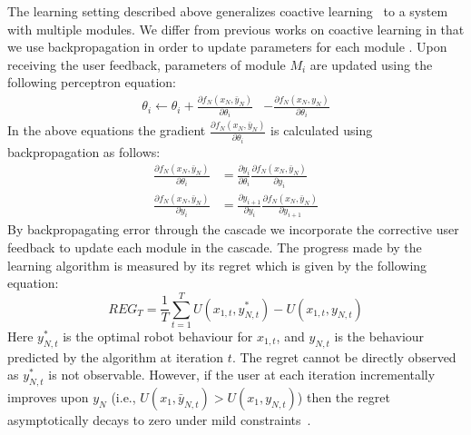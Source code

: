 The learning setting described above generalizes coactive learning~\citep{Jain13,Shivaswamy12} to a system with multiple modules. We differ from previous works on coactive learning in that we use  backpropagation in order to update parameters for each module . Upon receiving the user feedback, parameters of module $M_i$ are updated using the following perceptron equation:  
\begin{align}
\theta_i \leftarrow \theta_i +  \frac{\partial f_N(x_N,\bar{y}_N)}{\partial \theta_i} &- \frac{\partial f_N(x_N,{y}_N)}{\partial \theta_i}
\end{align}
In the above equations the	 gradient $\frac{\partial f_N(x_N,\bar{y}_N)}{\partial \theta_i}$ is calculated using backpropagation as follows:
\begin{align}
\frac{\partial f_N(x_N,\bar{y}_N)}{\partial \theta_i} &= \frac{\partial y_i}{\partial \theta_i}  \frac{\partial f_N(x_N,\bar{y}_N)	}{\partial y_{i}}\\
\frac{\partial f_N(x_N,\bar{y}_N)	}{\partial y_{i}} &= \frac{\partial y_{i+1}	}{\partial y_{i}} \frac{\partial f_N(x_N,\bar{y}_N)	}{\partial y_{i+1}}
\end{align}
By backpropagating error through the cascade we  incorporate the corrective user feedback to update each module in the cascade. The progress made by the learning algorithm is measured by its regret which is given by the following equation:%
\begin{equation}
\label{eq:regret}
REG_T = \frac{1}{T}\sum_{t=1}^T U(x_{1,t},y_{N,t}^*) - U(x_{1,t},y_{N,t}) 
\end{equation}
Here $y_{N,t}^*$ is the optimal robot behaviour for $x_{1,t}$, and $y_{N,t}$ is the behaviour predicted by the algorithm at iteration $t$. The regret cannot be directly observed as $y_{N,t}^*$ is not observable. However, if the user at each iteration incrementally improves upon $y_N$ (i.e., $U(x_1,\bar{y}_{N,t}) > U(x_1,{y}_{N,t})$) then the regret asymptotically decays to zero under mild constraints~\citep{Shivaswamy12,Jain13}.  